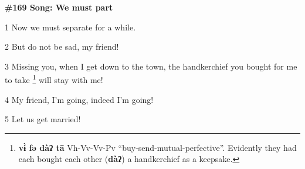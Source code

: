 
\textbf{\#169 Song: We must part}

1 Now we must separate for a while.

2 But do not be sad, my friend!

3 Missing you, when I get down to the town, the handkerchief you bought for me
to take \footnote{\textbf{vɨ̀ fə dàʔ tā} Vh-Vv-Vv-Pv ``buy-send-mutual-perfective''. Evidently they had each bought each other (\textbf{dàʔ}) a handkerchief as a keepsake.} will stay with me!

4 My friend, I'm going, indeed I'm going!

5 Let us get married!

